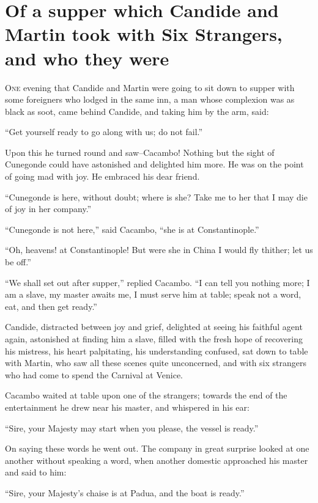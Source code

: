 \vspace{1cm}
\begingroup
\let\clearpage\relax
\chapter{Of a supper which Candide and Martin took with Six Strangers, and who they were}
\endgroup
\vspace{-1cm}
\lettrine[lraise=0.1,nindent=0em,slope=-.5em]{O}{ne} evening that Candide and Martin were going to sit down to supper with some foreigners who lodged in the same inn, a man whose complexion was as black as soot, came behind Candide, and taking him by the arm, said:

``Get yourself ready to go along with us; do not fail.''

Upon this he turned round and saw--Cacambo! Nothing but the sight of Cunegonde could have astonished and delighted him more. He was on the point of going mad with joy. He embraced his dear friend.

``Cunegonde is here, without doubt; where is she? Take me to her that I may die of joy in her company.''

``Cunegonde is not here,'' said Cacambo, ``she is at Constantinople.''

``Oh, heavens! at Constantinople! But were she in China I would fly thither; let us be off.''

``We shall set out after supper,'' replied Cacambo. ``I can tell you nothing more; I am a slave, my master awaits me, I must serve him at table; speak not a word, eat, and then get ready.''

Candide, distracted between joy and grief, delighted at seeing his faithful agent again, astonished at finding him a slave, filled with the fresh hope of recovering his mistress, his heart palpitating, his understanding confused, sat down to table with Martin, who saw all these scenes quite unconcerned, and with six strangers who had come to spend the Carnival at Venice.

Cacambo waited at table upon one of the strangers; towards the end of the entertainment he drew near his master, and whispered in his ear:

``Sire, your Majesty may start when you please, the vessel is ready.''

On saying these words he went out. The company in great surprise looked at one another without speaking a word, when another domestic approached his master and said to him:

``Sire, your Majesty's chaise is at Padua, and the boat is ready.''

